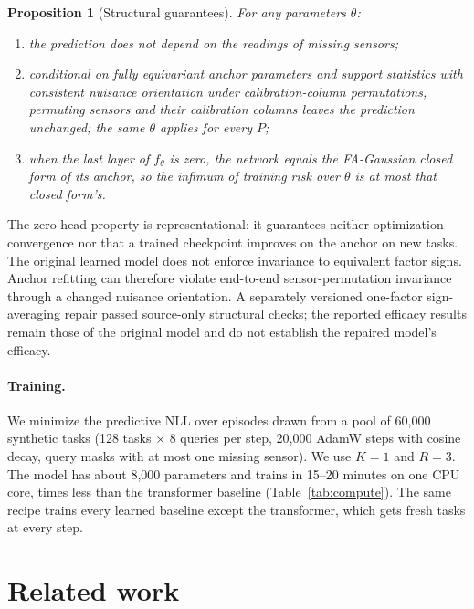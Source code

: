 \documentclass{article}
\newtheorem{proposition}{Proposition}
\begin{document}
\begin{proposition}[Structural guarantees]\label{prop:struct}
For any parameters $\theta$:
\begin{enumerate}
  \item[(i)] the prediction does not depend on the readings of missing sensors;
  \item[(ii)] conditional on fully equivariant anchor parameters and support statistics with consistent nuisance orientation under calibration-column
  permutations, permuting sensors and their calibration columns leaves the prediction unchanged; the same $\theta$
  applies for every $P$;
  \item[(iii)] when the last layer of $f_\theta$ is zero, the network equals the FA-Gaussian closed form of its
  anchor, so the infimum of training risk over $\theta$ is at most that closed form's.
\end{enumerate}
\end{proposition}

The zero-head property is representational: it guarantees neither optimization convergence nor that a trained
checkpoint improves on the anchor on new tasks.
The original learned model does not enforce invariance to equivalent factor signs. Anchor refitting can therefore
violate end-to-end sensor-permutation invariance through a changed nuisance orientation. A separately versioned
one-factor sign-averaging repair passed source-only structural checks; the reported efficacy results remain those
of the original model and do not establish the repaired model's efficacy.

\paragraph{Training.}
We minimize the predictive NLL over episodes drawn from a pool of 60{,}000 synthetic tasks (128 tasks $\times$ 8
queries per step, 20{,}000 AdamW steps with cosine decay, query masks with at most one missing sensor). We use $K=1$
and $R=3$. The model has about 8{,}000 parameters and trains in 15--20 minutes on one CPU core, \Computetrainratio{} times less than the transformer baseline (Table~\ref{tab:compute}). The same recipe trains
every learned baseline except the transformer, which gets fresh tasks at every step.



\section{Related work}
\label{sec:related}
\end{document}
